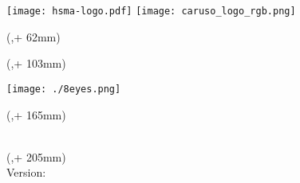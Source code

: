 \newlength{\bindekorrektur}
\newlength{\seitenanfang}
\newlength{\seitenbreite}

\setlength{\bindekorrektur}{-46mm}   %
\setlength{\seitenanfang}{0mm}       %
\setlength{\seitenbreite}{297mm}     %

\noindent\texttt{[image: hsma-logo.pdf]}\hfill
\noindent\texttt{[image: caruso\_logo\_rgb.png]}\\

\begin{textblock*}{128mm}(\hsmafenster,\seitenanfang + 62mm) %
  \centering\Large\sffamily
  \vspace{4mm} %
  \textbf{\hsmatitel}
\end{textblock*}%


\begin{textblock*}{128mm}(\hsmafenster,\seitenanfang + 103mm)
  \centering\large\sffamily
  \hsmaautor\\
  \vspace{2mm}
  \hsmacontact
  
\texttt{[image: ./8eyes.png]}
\end{textblock*}


\begin{textblock*}{\seitenbreite}(\bindekorrektur,\seitenanfang + 165mm)
  \centering\large\sffamily
  \hsmastudiengangname\\
  \vspace{2mm}
  \hsmafakultaetlang\\
  \vspace{2mm}
  \hsmakoerperschaft
\end{textblock*}

\begin{textblock*}{\seitenbreite}(\bindekorrektur,\seitenanfang + 205mm)
  \centering\large
  \textsf{\hsmadatum}\\
  \textsf{Version: \hsmaversion}
\end{textblock*}

